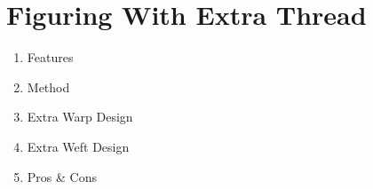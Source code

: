 \section{Figuring With Extra Thread}

\begin{enumerate}[label=\textbf{\Alph*.}]
    \item Features
    \item Method
    \item Extra Warp Design
    \item Extra Weft Design
    \item Pros \& Cons
\end{enumerate}